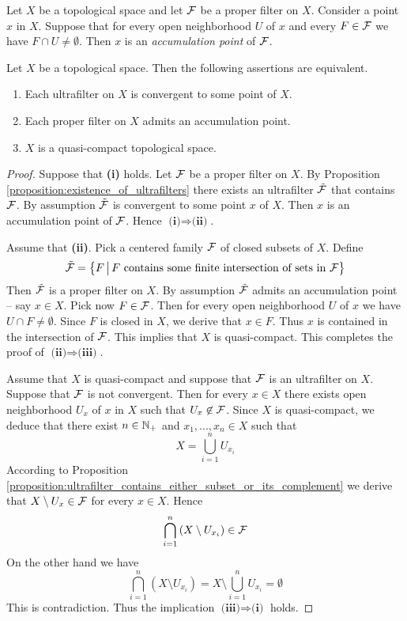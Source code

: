 \documentclass[10pt]{amsart}
\begin{document}
\begin{definition}
	Let $X$ be a topological space and let ${\mathcal F}$ be a proper filter on $X$. Consider a point $x$ in $X$. Suppose that for every open neighborhood $U$ of $x$ and every $F \in {\mathcal F}$ we have $F\cap U \neq \emptyset$. Then $x$ is an \textit{accumulation point} of ${\mathcal F}$.
\end{definition}

\begin{theorem}\label{theorem:quasi_compact_in_terms_of_ultrafilters}
	Let $X$ be a topological space. Then the following assertions are equivalent.
	\begin{enumerate}[label=\emph{\textbf{(\roman*)}}, leftmargin=*]
		\item Each ultrafilter on $X$ is convergent to some point of $X$.
		\item Each proper filter on $X$ admits an accumulation point.
		\item $X$ is a quasi-compact topological space.
	\end{enumerate}
\end{theorem}
\begin{proof}
	Suppose that \textbf{(i)} holds. Let ${\mathcal F}$ be a proper filter on $X$. By Proposition \ref{proposition:existence_of_ultrafilters} there exists an ultrafilter $\tilde{{\mathcal F}}$ that contains ${\mathcal F}$. By assumption $\tilde{{\mathcal F}}$ is convergent to some point $x$ of $X$. Then $x$ is an accumulation point of ${\mathcal F}$. Hence $\textbf{(i)}\Rightarrow \textbf{(ii)}$.

	Assume that \textbf{(ii)}. Pick a centered family ${\mathcal F}$ of closed subsets of $X$. Define
	$$\tilde{{\mathcal F}} = \big\{F\,\big|\,F\mbox{ contains some finite intersection of sets in }{\mathcal F}\big\}$$
	Then $\tilde{{\mathcal F}}$ is a proper filter on $X$. By assumption $\tilde{{\mathcal F}}$ admits an accumulation point – say $x\in X$. Pick now $F \in {\mathcal F}$. Then for every open neighborhood $U$ of $x$ we have $U\cap F \neq \emptyset$. Since $F$ is closed in $X$, we derive that $x\in F$. Thus $x$ is contained in the intersection of ${\mathcal F}$. This implies that $X$ is quasi-compact. This completes the proof of $\textbf{(ii)}\Rightarrow \textbf{(iii)}$.

	Assume that $X$ is quasi-compact and suppose that ${\mathcal F}$ is an ultrafilter on $X$. Suppose that ${\mathcal F}$ is not convergent. Then for every $x \in X$ there exists open neighborhood $U_x$ of $x$ in $X$ such that $U_x \not \in {\mathcal F}$. Since $X$ is quasi-compact, we deduce that there exist $n\in {\mathbb N}_+$ and $x_1,...,x_n \in X$ such that
	$$X = \bigcup_{i=1}^nU_{x_i}$$
	According to Proposition \ref{proposition:ultrafilter_contains_either_subset_or_its_complement} we derive that $X \setminus U_x \in {\mathcal F}$ for every $x \in X$. Hence
	$$\bigcap_{i=1}^n\left(X\setminus U_{x_i}\right) \in {\mathcal F}$$
	On the other hand we have
	$$\bigcap_{i=1}^n\left(X\setminus U_{x_i}\right) = X \setminus \bigcup_{i=1}^nU_{x_i} = \emptyset$$
	This is contradiction. Thus the implication $\textbf{(iii)}\Rightarrow \textbf{(i)}$ holds.
\end{proof}
\end{document}

